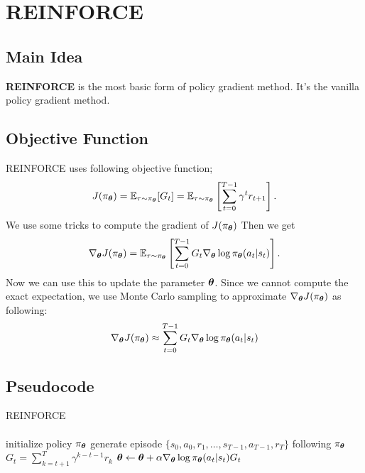 \section{REINFORCE}
    \subsection{Main Idea}
        \textbf{REINFORCE} is the most basic form of policy gradient method.
        It's the vanilla policy gradient method.
    \subsection{Objective Function}
        REINFORCE uses following objective function;
        \begin{equation}
            J(\pi_{\boldsymbol{\theta}})=\mathbb{E}_{\tau \sim \pi_{\boldsymbol{\theta}}}[G_t] = \mathbb{E}_{\tau \sim \pi_{\boldsymbol{\theta}}}\left[ \sum_{t=0}^{T-1}\gamma^tr_{t+1} \right].
        \end{equation}
        We use some tricks to compute the gradient of $J(\pi_{\boldsymbol{\theta}})$
        Then we get
        \begin{equation}
            \nabla_{\boldsymbol{\theta}} J(\pi_{\boldsymbol{\theta}}) = \mathbb{E}_{\tau \sim \pi_{\boldsymbol{\theta}}}\left[ \sum_{t=0}^{T-1}G_t\nabla_{\boldsymbol{\theta}}\log{\pi_{\boldsymbol{\theta}}(a_t|s_t)} \right].
        \end{equation}
        Now we can use this to update the parameter ${\boldsymbol{\theta}}$. Since we cannot compute the exact expectation, we use Monte Carlo sampling
        to approximate $\nabla_{\boldsymbol{\theta}} J(\pi_{\boldsymbol{\theta}})$ as following:
        \begin{equation}
            \nabla_{\boldsymbol{\theta}} J(\pi_{\boldsymbol{\theta}}) \approx \sum_{t=0}^{T-1}G_t\nabla_{\boldsymbol{\theta}}\log{\pi_{\boldsymbol{\theta}}(a_t|s_t)}
        \end{equation}
    \subsection{Pseudocode}
        {REINFORCE}
        {
             \\
             \\
        }
        {
        }
        {
            initialize policy $\pi_\param$\;
            {
                generate episode $\{s_0,a_0,r_1,\dots,s_{T-1},a_{T-1},r_{T}\}$ following $\pi_\param$\;
                {
                    $G_t=\sum_{k=t+1}^{T} \gamma^{k-t-1}r_k$\;
                    ${\boldsymbol{\theta}} \leftarrow {\boldsymbol{\theta}} + \alpha\nabla_{\boldsymbol{\theta}}\log{\pi_{\boldsymbol{\theta}}(a_t|s_t)}G_t$\;
                }
            }
            \Return{$\pi_\param$}
        }
